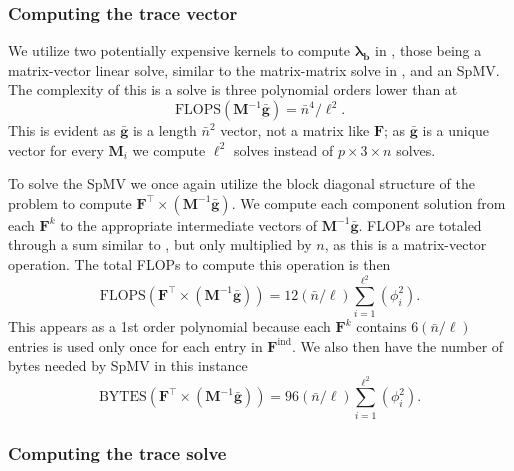 
%
%
%
\subsubsection{Computing the trace vector}

%
%
%
We utilize two potentially expensive kernels to compute $\symbf{\lambda}_{\textbf{b}}$ in , those being a matrix-vector linear solve, similar to the matrix-matrix solve in , and an SpMV. 
The complexity of this is a solve is three polynomial orders lower than  at
\begin{equation}
	\text{FLOPS}(\textbf{M}^{-1}\bar{\textbf{g}}) = \bar{n}^4/\ell^2.
\end{equation}
\noindent
This is evident as $\bar{\textbf{g}}$ is a length $\bar{n}^2$ vector, not a matrix like $\textbf{F}$; as $\bar{\textbf{g}}$ is a unique vector for every $\textbf{M}_i$ we compute $\ell^2$ solves instead of $p \times 3 \times n$ solves.

%
%
%
To solve the SpMV we once again utilize the block diagonal structure of the problem to compute $\textbf{F}^\intercal \times (\textbf{M}^{-1}\bar{\textbf{g}})$. 
We compute each component solution from each $\textbf{F}^k$ to the appropriate intermediate vectors of $\textbf{M}^{-1}\bar{\textbf{g}}$.
FLOPs are totaled through a sum similar to , but only multiplied by $n$, as this is a matrix-vector operation.  
The total FLOPs to compute this operation is then 
\begin{equation}
	\text{FLOPS}(\textbf{F}^\intercal \times (\textbf{M}^{-1}\bar{\textbf{g}})) = 12(\bar{n}/\ell) \sum_{i=1}^{\ell^2} (\phi_i^2).
\end{equation}
This appears as a 1st order polynomial because each $\textbf{F}^k$ contains $6(\bar{n}/\ell)$ entries is used only once for each entry in $\textbf{F}^{\text{ind}}$.
We also then have the number of bytes needed by SpMV in this instance
\begin{equation}
	\text{BYTES}(\textbf{F}^\intercal \times (\textbf{M}^{-1}\bar{\textbf{g}})) = 96(\bar{n}/\ell) \sum_{i=1}^{\ell^2} (\phi_i^2).
\end{equation}

%
%
%
\subsubsection{Computing the trace solve}

